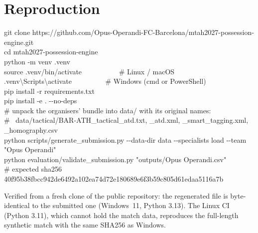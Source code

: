 \documentclass[10pt,a4paper]{article}
\begin{document}
\section{Reproduction}
\begin{tcolorbox}[colback=black!85,colupper=white,boxrule=0pt,arc=2pt,left=6pt,right=6pt]
\footnotesize\ttfamily
git clone https://github.com/Opus-Operandi-FC-Barcelona/mtah2027-possession-engine.git\\
cd mtah2027-possession-engine\\
python -m venv .venv\\
source .venv/bin/activate \ \ \ \ \ \ \ \ \ \ \# Linux / macOS\\
.venv\textbackslash Scripts\textbackslash activate \ \ \ \ \ \ \ \ \ \# Windows (cmd or PowerShell)\\
pip install -r requirements.txt\\
pip install -e . -{}-no-deps\\
\# unpack the organisers' bundle into data/ with its original names:\\
\# \ data/tactical/BAR-ATH\_tactical\_atd.txt, \_atd.xml, \_smart\_tagging.xml, \_homography.csv\\
python scripts/generate\_submission.py -{}-data-dir data -{}-specialists load -{}-team "Opus Operandi"\\
python evaluation/validate\_submission.py "outputs/Opus Operandi.csv"\\
\# expected sha256 40f95b38fbcc942de6492a102ea74d72e180689e6f3b59c805d61edaa5116a7b
\end{tcolorbox}
Verified from a fresh clone of the public repository: the regenerated file is byte-identical to the submitted one (Windows~11, Python 3.13). The Linux CI (Python 3.11), which cannot hold the match data, reproduces the full-length synthetic match with the same SHA256 as Windows.
\end{document}
